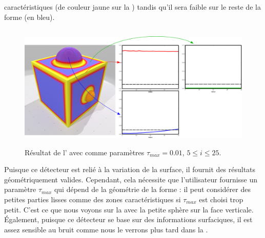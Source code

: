caractéristiques (de couleur jaune sur la )
tandis qu'il sera faible sur le reste de la forme (en bleu).
%
\begin{figure}[ht]{
  \begin{center}
    \includegraphics[height=6cm]{figures/CubeSpherePlotPauly}
  \end{center}}
    \caption[Résultat de l']{Résultat de l' avec comme paramètres $\tau_{max} = 0.01$, $5 \le i \le 25$.
    \label{fig:pauly-cubesphere}}
\end{figure}
%
Puisque ce détecteur est relié à la variation de la surface, il fournit des
résultats géométriquement valides. Cependant, cela nécessite que l'utilisateur
fournisse un paramètre $\tau_{max}$ qui dépend de la géométrie de la forme : il
peut considérer des petites parties lisses comme des zones caractéristiques si
$\tau_{max}$ est choisi trop petit. C'est ce que nous voyons sur la
 avec la petite sphère sur la face verticale.
Également, puisque ce détecteur se base sur des informations surfaciques, il est
assez sensible au bruit comme nous le verrons plus tard dans la
.
%
